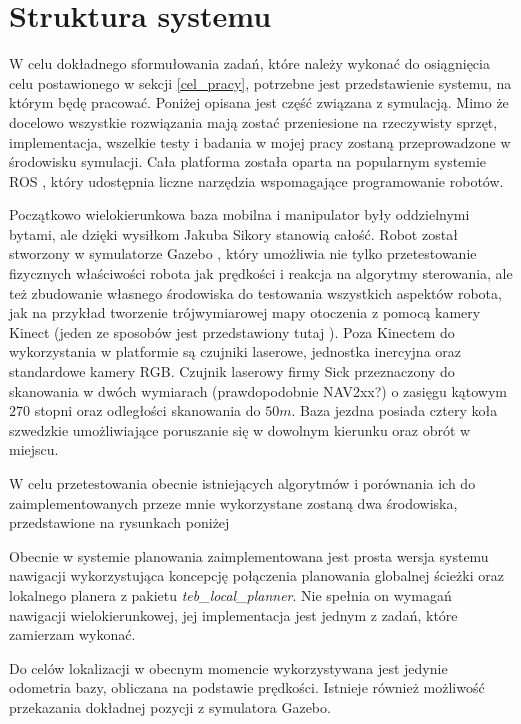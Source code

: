 \section{Struktura systemu}
\label{struktura_systemu}

W celu dokładnego sformułowania zadań, które należy wykonać do osiągnięcia celu postawionego w sekcji \ref{cel_pracy}, potrzebne jest przedstawienie systemu, na którym będę pracować. 
Poniżej opisana jest część związana z symulacją.
Mimo że docelowo wszystkie rozwiązania mają zostać przeniesione na rzeczywisty sprzęt, implementacja, wszelkie testy i badania w mojej pracy zostaną przeprowadzone w środowisku symulacji. 
Cała platforma została oparta na popularnym systemie ROS \cite{ros}, który udostępnia liczne narzędzia wspomagające programowanie robotów.

Początkowo wielokierunkowa baza mobilna i manipulator były oddzielnymi bytami, ale dzięki wysiłkom Jakuba Sikory \cite{jsikora-bsc-20-twiki} stanowią całość.
Robot został stworzony w symulatorze Gazebo \cite{gazebo}, który umożliwia nie tylko przetestowanie fizycznych właściwości robota jak prędkości i reakcja na algorytmy sterowania, ale też zbudowanie własnego środowiska do testowania wszystkich aspektów robota, jak na przykład tworzenie trójwymiarowej mapy otoczenia z pomocą kamery Kinect (jeden ze sposobów jest przedstawiony tutaj \cite{kinect_setup}).
Poza Kinectem do wykorzystania w platformie są czujniki laserowe, jednostka inercyjna oraz standardowe kamery RGB.
Czujnik laserowy firmy Sick przeznaczony do skanowania w dwóch wymiarach (prawdopodobnie NAV2xx?) \cite{lidar} o zasięgu kątowym $270$ stopni oraz odległości skanowania do $50m$. 
Baza jezdna posiada cztery koła szwedzkie umożliwiające poruszanie się w dowolnym kierunku oraz obrót w miejscu.



W celu przetestowania obecnie istniejących algorytmów i porównania ich do zaimplementowanych przeze mnie wykorzystane zostaną dwa środowiska, przedstawione na rysunkach poniżej

Obecnie w systemie planowania zaimplementowana jest prosta wersja systemu  nawigacji wykorzystująca koncepcję połączenia planowania globalnej ścieżki oraz lokalnego planera z pakietu \textit{teb\_local\_planner}. 
Nie spełnia on wymagań nawigacji wielokierunkowej, jej implementacja jest jednym z zadań, które zamierzam wykonać.

Do celów lokalizacji w obecnym momencie wykorzystywana jest jedynie odometria bazy, obliczana na podstawie prędkości. Istnieje również możliwość przekazania dokładnej pozycji z symulatora Gazebo.



